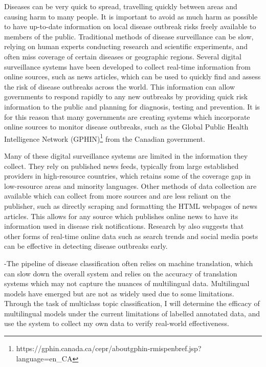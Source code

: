 \documentclass{l4proj}
\begin{document}
Diseases can be very quick to spread, travelling quickly between areas and causing harm to many people. It is important to avoid as much harm as possible to have up-to-date information on local disease outbreak risks freely available to members of the public. Traditional methods of disease surveillance can be slow, relying on human experts conducting research and scientific experiments, and often miss coverage of certain diseases or geographic regions. Several digital surveillance systems have been developed to collect real-time information from online sources, such as news articles, which can be used to quickly find and assess the risk of disease outbreaks across the world. This information can allow governments to respond rapidly to any new outbreaks by providing quick risk information to the public and planning for diagnosis, testing and prevention. It is for this reason that many governments are creating systems which incorporate online sources to monitor disease outbreaks, such as the Global Public Health Intelligence Network (GPHIN)\footnote{https://gphin.canada.ca/cepr/aboutgphin-rmispenbref.jsp?language=en_CA} from the Canadian government. \par
Many of these digital surveillance systems are limited in the information they collect. They rely on published news feeds, typically from large established providers in high-resource countries, which retains some of the coverage gap in low-resource areas and minority languages. Other methods of data collection are available which can collect from more sources and are less reliant on the publisher, such as directly scraping and formatting the HTML webpages of news articles. This allows for any source which publishes online news to have its information used in disease risk notifications. Research by \cite{seo2017methods} also suggests that other forms of real-time online data such as search trends and social media posts can be effective in detecting disease outbreaks early.\par

-The pipeline of disease classification often relies on machine translation, which can slow down the overall system and relies on the accuracy of translation systems which may not capture the nuances of multilingual data. Multilingual models have emerged but are not as widely used due to some limitations. Through the task of multiclass topic classification, I will determine the efficacy of multilingual models under the current limitations of labelled annotated data, and use the system to collect my own data to verify real-world effectiveness.
\end{document}
